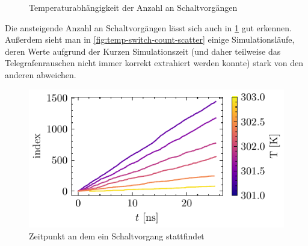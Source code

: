 \documentclass[main.tex]{subfiles}
\begin{document}
\begin{figure}[H]
    \centering
    \caption{Temperaturabhängigkeit der Anzahl an Schaltvorgängen  }\label{fig:temp-switch-count}
\end{figure}

Die ansteigende Anzahl an Schaltvorgängen lässt sich auch in \cref{fig:temp-switch-count} gut erkennen. Außerdem sieht man in \cref{fig:temp-switch-count-scatter} einige Simulationsläufe, deren Werte aufgrund der Kurzen Simulationszeit (und daher teilweise das Telegrafenrauschen nicht immer korrekt extrahiert werden konnte) stark von den anderen abweichen.

\begin{figure}[H]
    \centering
    \includegraphics{bilder/plots/temp_comparison/switch_events.pdf}
    \caption{Zeitpunkt an dem ein Schaltvorgang stattfindet }\label{fig:switch-events}
\end{figure}
\end{document}
